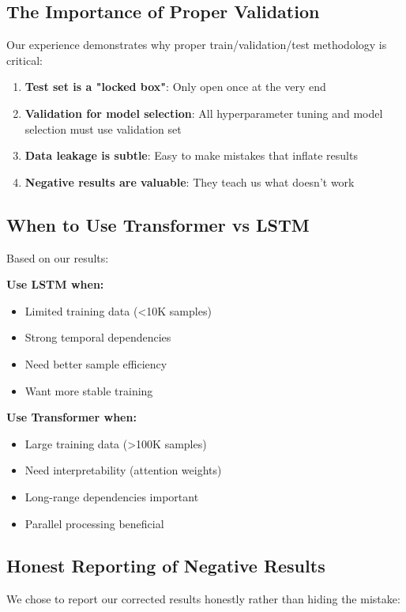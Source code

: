 \documentclass[10pt,twocolumn]{article}
\begin{document}
\subsection{The Importance of Proper Validation}

Our experience demonstrates why proper train/validation/test methodology is critical:

\begin{enumerate}
\item \textbf{Test set is a "locked box"}: Only open once at the very end
\item \textbf{Validation for model selection}: All hyperparameter tuning and model selection must use validation set
\item \textbf{Data leakage is subtle}: Easy to make mistakes that inflate results
\item \textbf{Negative results are valuable}: They teach us what doesn't work
\end{enumerate}

\subsection{When to Use Transformer vs LSTM}

Based on our results:

\textbf{Use LSTM when:}
\begin{itemize}
\item Limited training data (<10K samples)
\item Strong temporal dependencies
\item Need better sample efficiency
\item Want more stable training
\end{itemize}

\textbf{Use Transformer when:}
\begin{itemize}
\item Large training data (>100K samples)
\item Need interpretability (attention weights)
\item Long-range dependencies important
\item Parallel processing beneficial
\end{itemize}

\subsection{Honest Reporting of Negative Results}

We chose to report our corrected results honestly rather than hiding the mistake:
\end{document}
